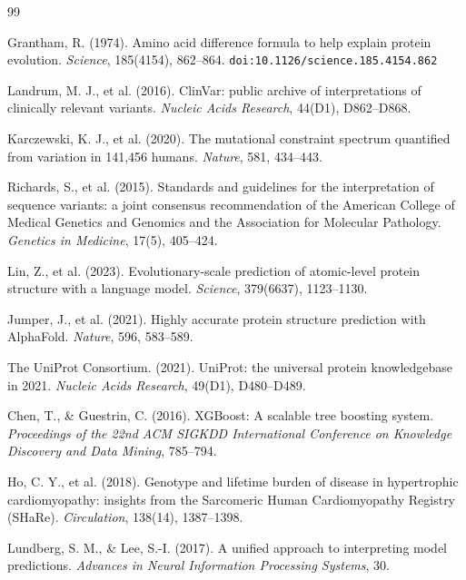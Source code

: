 \documentclass[12pt,a4paper]{article}
\begin{document}
\begin{thebibliography}{99}

Grantham, R. (1974).
Amino acid difference formula to help explain protein evolution.
\textit{Science}, 185(4154), 862--864.
\texttt{doi:10.1126/science.185.4154.862}

Landrum, M. J., et al. (2016).
ClinVar: public archive of interpretations of clinically relevant variants.
\textit{Nucleic Acids Research}, 44(D1), D862--D868.

Karczewski, K. J., et al. (2020).
The mutational constraint spectrum quantified from variation in 141,456 humans.
\textit{Nature}, 581, 434--443.

Richards, S., et al. (2015).
Standards and guidelines for the interpretation of sequence variants: a joint
consensus recommendation of the American College of Medical Genetics and Genomics
and the Association for Molecular Pathology.
\textit{Genetics in Medicine}, 17(5), 405--424.

Lin, Z., et al. (2023).
Evolutionary-scale prediction of atomic-level protein structure with a language model.
\textit{Science}, 379(6637), 1123--1130.

Jumper, J., et al. (2021).
Highly accurate protein structure prediction with AlphaFold.
\textit{Nature}, 596, 583--589.

The UniProt Consortium. (2021).
UniProt: the universal protein knowledgebase in 2021.
\textit{Nucleic Acids Research}, 49(D1), D480--D489.

Chen, T., \& Guestrin, C. (2016).
XGBoost: A scalable tree boosting system.
\textit{Proceedings of the 22nd ACM SIGKDD International Conference on
Knowledge Discovery and Data Mining}, 785--794.

Ho, C. Y., et al. (2018).
Genotype and lifetime burden of disease in hypertrophic cardiomyopathy:
insights from the Sarcomeric Human Cardiomyopathy Registry (SHaRe).
\textit{Circulation}, 138(14), 1387--1398.

Lundberg, S. M., \& Lee, S.-I. (2017).
A unified approach to interpreting model predictions.
\textit{Advances in Neural Information Processing Systems}, 30.

\end{thebibliography}
\end{document}
